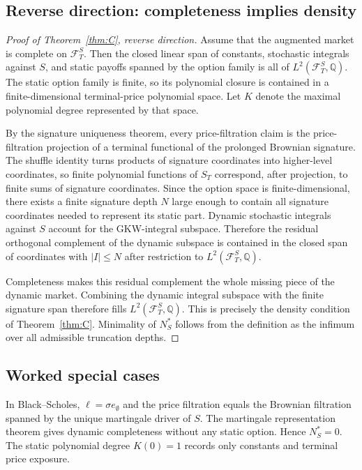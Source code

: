 \documentclass[11pt,oneside]{article}
\theoremstyle{plain}
\theoremstyle{definition}
\theoremstyle{remark}
\newcommand{\Q}{\mathbb{Q}}
\newcommand{\FS}{\mathcal F^S}
\begin{document}
\subsection{Reverse direction: completeness implies density}

\begin{proof}[Proof of Theorem~\ref{thm:C}, reverse direction]
Assume that the augmented market is complete on $\FS_T$. Then the closed linear span of constants, stochastic integrals against $S$, and static payoffs spanned by the option family is all of $L^2(\FS_T,\Q)$. The static option family is finite, so its polynomial closure is contained in a finite-dimensional terminal-price polynomial space. Let $K$ denote the maximal polynomial degree represented by that space.

By the signature uniqueness theorem, every price-filtration claim is the price-filtration projection of a terminal functional of the prolonged Brownian signature. The shuffle identity turns products of signature coordinates into higher-level coordinates, so finite polynomial functions of $S_T$ correspond, after projection, to finite sums of signature coordinates. Since the option space is finite-dimensional, there exists a finite signature depth $N$ large enough to contain all signature coordinates needed to represent its static part. Dynamic stochastic integrals against $S$ account for the GKW-integral subspace. Therefore the residual orthogonal complement of the dynamic subspace is contained in the closed span of coordinates with $|I|\leq N$ after restriction to $L^2(\FS_T,\Q)$.

Completeness makes this residual complement the whole missing piece of the dynamic market. Combining the dynamic integral subspace with the finite signature span therefore fills $L^2(\FS_T,\Q)$. This is precisely the density condition of Theorem~\ref{thm:C}. Minimality of $N_S^\ast$ follows from the definition as the infimum over all admissible truncation depths.
\end{proof}

\subsection{Worked special cases}

In Black--Scholes, $\ell=\sigma e_\emptyset$ and the price filtration equals the Brownian filtration spanned by the unique martingale driver of $S$. The martingale representation theorem gives dynamic completeness without any static option. Hence $N_S^\ast=0$. The static polynomial degree $K(0)=1$ records only constants and terminal price exposure.
\end{document}
